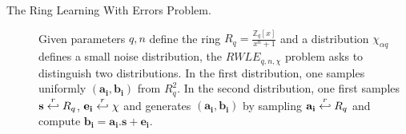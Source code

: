 \begin{description}
\item[The Ring Learning With Errors Problem.]
  \begin{definition}
    [RWLE] Given parameters $q,n$ define the ring
    \(R_{q} = \frac{\mathbb{Z}_{q}[x]}{x^{n} + 1} \) and a distribution
    \(\chi_{\alpha q}\) defines a small noise distribution, the
    $RWLE_{q,n,\chi}$ problem asks to distinguish two distributions. In the
    first distribution, one samples uniformly $(\mathbf{a_i},\mathbf{b_i})$ from
    $R_q^2$.  In the second distribution, one first samples
    $\mathbf{s} \stackrel{r}{\hookleftarrow} R_q$, $\mathbf{e_i} \stackrel{r}{\hookleftarrow} \chi$ and
    generates $(\mathbf{a_i},\mathbf{b_i})$ by sampling
    $\mathbf{a_i} \stackrel{r}{\hookleftarrow} R_q$ and compute
    $\mathbf{b_i} = \mathbf{a_i}.\mathbf{s} + \mathbf{e_i}$.
  \end{definition}


\end{description}
